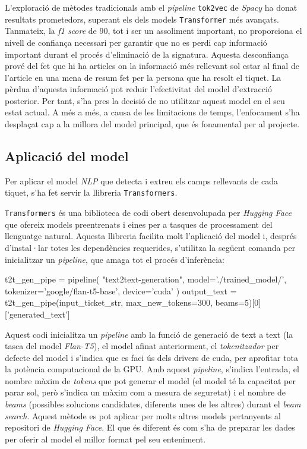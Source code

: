 L'exploració de mètodes tradicionals amb el \textit{pipeline} \texttt{tok2vec} de \textit{Spacy} ha donat resultats prometedors, superant els dels models \texttt{Transformer} més avançats. Tanmateix, la \textit{f1 score} de 90, tot i ser un assoliment important, no proporciona el nivell de confiança necessari per garantir que no es perdi cap informació important durant el procés d'eliminació de la signatura. Aquesta desconfiança prové del fet que hi ha articles on la informació més rellevant sol estar al final de l'article en una mena de resum fet per la persona que ha resolt el tiquet. La pèrdua d'aquesta informació pot reduir l'efectivitat del model d'extracció posterior. Per tant, s'ha pres la decisió de no utilitzar aquest model en el seu estat actual. A més a més, a causa de les limitacions de temps, l'enfocament s'ha desplaçat cap a la millora del model principal, que és fonamental per al projecte.

\subsection{Aplicació del model}
Per aplicar el model \textit{NLP} que detecta i extreu els camps rellevants de cada tiquet, s'ha fet servir la llibreria \texttt{Transformers}.

\texttt{Transformers} és una biblioteca de codi obert desenvolupada per \textit{Hugging Face} \cite{Hugging-Face} que ofereix models preentrenats i eines per a tasques de processament del llenguatge natural. Aquesta llibreria facilita molt l'aplicació del model i, després d'instal·lar totes les dependències requerides, s'utilitza la següent comanda per inicialitzar un \textit{pipeline}, que amaga tot el procés d'inferència:

\begin{python}
t2t_gen_pipe = pipeline(
     "text2text-generation",
     model='./trained_model/',
     tokenizer='google/flan-t5-base',
     device='cuda'
     )     
output_text = t2t_gen_pipe(input_ticket_str, max_new_tokens=300, beams=5)[0]['generated_text']
\end{python}

Aquest codi inicialitza un \textit{pipeline} amb la funció de generació de text a text (la tasca del model \textit{Flan-T5}), el model afinat anteriorment, el \textit{tokenitzador} per defecte del model i s'indica que es faci ús dels drivers de cuda, per aprofitar tota la potència computacional de la GPU. Amb aquest \textit{pipeline}, s'indica l'entrada, el nombre màxim de \textit{tokens} que pot generar el model (el model té la capacitat per parar sol, però s'indica un màxim com a mesura de seguretat) i el nombre de \textit{beams} (possibles solucions candidates, diferents unes de les altres) durant el \textit{beam search}. Aquest mètode es pot aplicar per molts altres models pertanyents al repositori de \textit{Hugging Face}. El que és diferent és com s'ha de preparar les dades per oferir al model el millor format pel seu enteniment.

